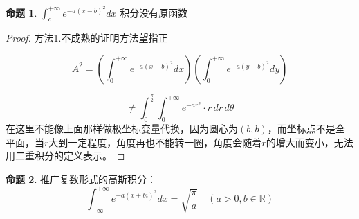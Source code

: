\documentclass[12pt,a4paper]{article}
\numberwithin{subsection}{section}   %
\numberwithin{subsubsection}{subsection}
\theoremstyle{plain}
\theoremstyle{definition}
\newtheorem{example}{命题}[subsection]  %
\theoremstyle{remark}
\theoremstyle{remark}
\begin{document}
	\begin{example}
		\label{ex:2}
		$	\int_{c}^{+\infty} e^{-a(x-b)^2} dx$
		积分没有原函数
	\end{example}
	
	\begin{proof}
		
		
		方法1.不成熟的证明方法望指正
		
		
		
		
		
		\begin{equation*}
			A^2 = \left( \int_{0}^{+\infty} e^{-a(x-b)^2} dx \right) \left( \int_{0}^{+\infty} e^{-a(y-b)^2} dy \right)
		\end{equation*}
		
		\begin{equation*}
			\neq \int_{0}^{\frac{\pi}{2}} \int_{0}^{+\infty} e^{-ar^2} \cdot r \, dr \, d\theta
		\end{equation*}
		在这里不能像上面那样做极坐标变量代换，因为圆心为$(b,b)$，而坐标点不是全平面，当$r$大到一定程度，角度再也不能转一圈，角度会随着$r$的增大而变小，无法用二重积分的定义表示。
		
		
	\end{proof}
	
	
	\begin{example}
		\label{ex:2}
		推广复数形式的高斯积分：
		\begin{equation}
			\int_{-\infty}^{+\infty} e^{-a(x+bi)^2} dx = \sqrt{\frac{\pi}{a}} \quad (a>0, b \in \mathbb{R})
		\end{equation}
	\end{example}
	
\end{document}
